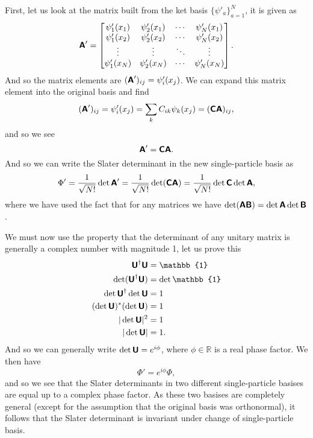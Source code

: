\documentclass[a4paper, 11pt, notitlepage, english]{article}
\newcommand{\mat}[1]{\textsf{\textbf{#1}}}
\begin{document}
First, let us look at the matrix built from the ket basis $\{\psi'_a\}_{a=1}^N$, it is given as
$$\mat A' = \begin{bmatrix}
\psi'_1(x_1) & \psi'_2 (x_1) & \cdots & \psi'_N(x_1) \\
\psi'_1(x_2) & \psi'_2 (x_2) & \cdots & \psi'_N(x_2) \\
\vdots & \vdots & \ddots & \vdots \\
\psi'_1(x_N) & \psi'_2 (x_N) & \cdots & \psi'_N(x_N) \end{bmatrix}.$$
And so the matrix elements are $(\mat A')_{ij} = \psi'_i(x_j)$. We can expand this matrix element into the original basis and find
$$(\mat A')_{ij} = \psi'_i(x_j) = \sum_k C_{ik}\psi_k(x_j) = (\mat C \mat A)_{ij},$$
and so we see 
$$\mat A' = \mat C \mat A.$$
And so we can write the Slater determinant in the new single-particle basis as
$$\Phi' = \frac{1}{\sqrt{N!}} \det \mat A' = \frac{1}{\sqrt{N!}} \det (\mat C \mat A) = \frac{1}{\sqrt{N!}} \det \mat C \det \mat A,$$
where we have used the fact that for any matrices we have $\det(\mat A \mat B) = \det \mat A \det \mat B$.

We must now use the property that the determinant of any unitary matrix is generally a complex number with magnitude 1, let us prove this
\begin{align*}
\mat U^\dag \mat U &= \mathbb{1} \\
\det (\mat U^\dag \mat U) &= \det \mathbb{1} \\
\det \mat U^\dag \det \mat U &= 1 \\
(\det \mat U)^* (\det \mat U) &= 1 \\
|\det \mat U|^2 &= 1 \\
|\det \mat U| &= 1.
\end{align*}
And so we can generally write $\det \mat U = e^{i\phi}$, where $\phi \in \mathbb{R}$ is a real phase factor. We then have
$$\Phi' = e^{i\phi} \Phi,$$
and so we see that the Slater determinants in two different single-particle basises are equal up to a complex phase factor. As these two basises are completely general (except for the assumption that the original basis was orthonormal), it follows that the Slater determinant is invariant under change of single-particle basis.
\end{document}
